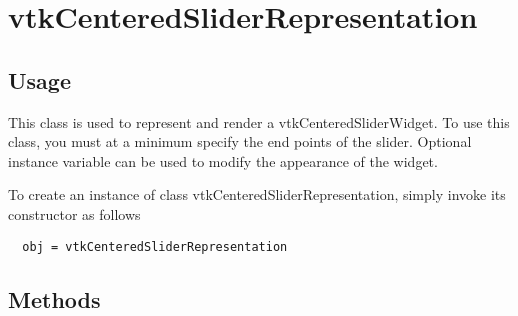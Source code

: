 \section{vtkCenteredSliderRepresentation}

\subsection{Usage}

 This class is used to represent and render a vtkCenteredSliderWidget. To use this
 class, you must at a minimum specify the end points of the
 slider. Optional instance variable can be used to modify the appearance of
 the widget.


To create an instance of class vtkCenteredSliderRepresentation, simply
invoke its constructor as follows
\begin{verbatim}
  obj = vtkCenteredSliderRepresentation
\end{verbatim}
\subsection{Methods}

